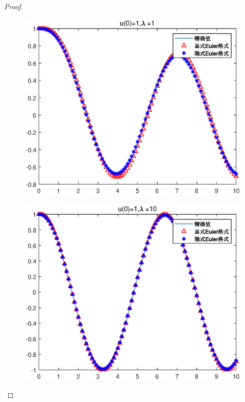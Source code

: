 \documentclass{article}%
\begin{document}
\begin{proof}
\begin{figure}
	\includegraphics[width=1\linewidth]{pic/week7_1_5.eps}
	\label{Fig:5}
	\caption{} 
\end{figure}
\begin{figure}
	\includegraphics[width=1\linewidth]{pic/week7_1_6.eps}
	\label{Fig:6}
	\caption{} 
\end{figure}
\begin{figure}

\end{figure}
\end{proof}
\end{document}

